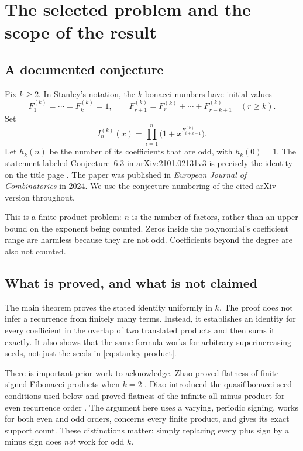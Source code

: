 \documentclass[11pt]{article}
\numberwithin{equation}{section}
\theoremstyle{definition}
\theoremstyle{remark}
\begin{document}
\section{The selected problem and the scope of the result}
\subsection{A documented conjecture}
Fix $k\ge2$. In Stanley's notation, the $k$-bonacci numbers have initial values
\[
F^{(k)}_1=\cdots=F^{(k)}_k=1,
\qquad
F^{(k)}_{r+1}=F^{(k)}_r+\cdots+F^{(k)}_{r-k+1}\quad(r\ge k).
\]
Set
\begin{equation}\label{eq:stanley-product}
I_n^{(k)}(x)=\prod_{i=1}^n\bigl(1+x^{F^{(k)}_{i+k-1}}\bigr).
\end{equation}
Let $h_k(n)$ be the number of its coefficients that are odd, with $h_k(0)=1$.
The statement labeled Conjecture~6.3 in arXiv:2101.02131v3 is precisely the
identity on the title page \cite[\S6, p.~24]{Stanley}. The paper was published
in \emph{European Journal of Combinatorics} in 2024. We use the conjecture
numbering of the cited arXiv version throughout.

This is a finite-product problem: $n$ is the number of factors, rather than an
upper bound on the exponent being counted. Zeros inside the polynomial's
coefficient range are harmless because they are not odd. Coefficients beyond
the degree are also not counted.

\subsection{What is proved, and what is not claimed}
The main theorem proves the stated identity uniformly in $k$. The proof does
not infer a recurrence from finitely many terms. Instead, it establishes an
identity for every coefficient in the overlap of two translated products and
then sums it exactly. It also shows that the same formula works for arbitrary
superincreasing seeds, not just the seeds in \eqref{eq:stanley-product}.

There is important prior work to acknowledge. Zhao proved flatness of finite
signed Fibonacci products when $k=2$ \cite{Zhao}. Diao introduced the
quasifibonacci seed conditions used below and proved flatness of the infinite
all-minus product for even recurrence order \cite[Definition~1.1 and
Theorem~1.1]{Diao}. The argument here uses a varying, periodic signing, works
for both even and odd orders, concerns every finite product, and gives its
exact support count. These distinctions matter: simply replacing every plus
sign by a minus sign does \emph{not} work for odd $k$.
\end{document}
